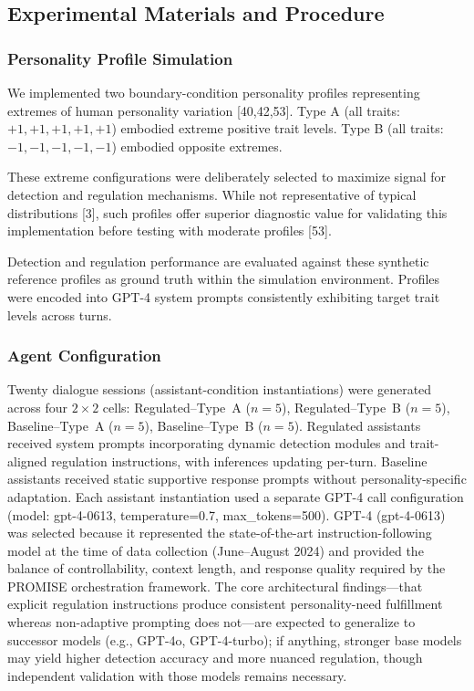 \documentclass[apajournal,article,submit,moreauthors]{Definitions/mdpi}
\begin{document}
\subsection{Experimental Materials and Procedure}\label{experimental-materials-and-procedure}

\subsubsection{Personality Profile Simulation}\label{personality-profile-simulation}

We implemented two boundary-condition personality profiles representing extremes of human personality variation {[}40,42,53{]}. Type A (all traits: $+1, +1, +1, +1, +1$) embodied extreme positive trait levels. Type B (all traits: $-1, -1, -1, -1, -1$) embodied opposite extremes.

These extreme configurations were deliberately selected to maximize signal for detection and regulation mechanisms. While not representative of typical distributions {[}3{]}, such profiles offer superior diagnostic value for validating this implementation before testing with moderate profiles {[}53{]}.

Detection and regulation performance are evaluated against these synthetic reference profiles as ground truth within the simulation environment. Profiles were encoded into GPT-4 system prompts consistently exhibiting target trait levels across turns.

\subsubsection{Agent Configuration}\label{agent-configuration}

Twenty dialogue sessions (assistant-condition instantiations) were generated across four $2 \times 2$ cells: Regulated--Type~A ($n=5$), Regulated--Type~B ($n=5$), Baseline--Type~A ($n=5$), Baseline--Type~B ($n=5$). Regulated assistants received system prompts incorporating dynamic detection modules and trait-aligned regulation instructions, with inferences updating per-turn. Baseline assistants received static supportive response prompts without personality-specific adaptation. Each assistant instantiation used a separate GPT-4 call configuration (model: gpt-4-0613, temperature=0.7, max\_tokens=500). GPT-4 (gpt-4-0613) was selected because it represented the state-of-the-art instruction-following model at the time of data collection (June--August 2024) and provided the balance of controllability, context length, and response quality required by the PROMISE orchestration framework. The core architectural findings---that explicit regulation instructions produce consistent personality-need fulfillment whereas non-adaptive prompting does not---are expected to generalize to successor models (e.g., GPT-4o, GPT-4-turbo); if anything, stronger base models may yield higher detection accuracy and more nuanced regulation, though independent validation with those models remains necessary.
\end{document}
